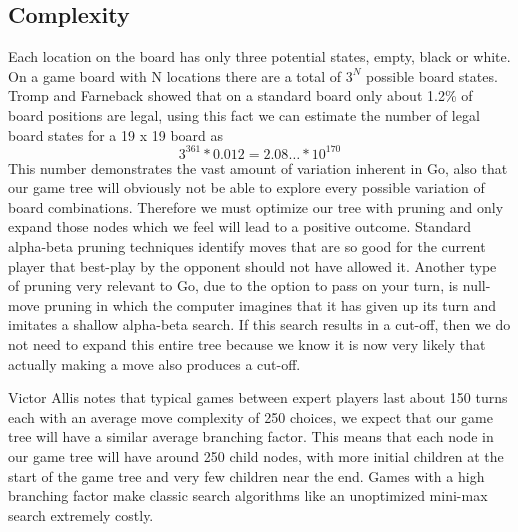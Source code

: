 \documentclass[conference]{IEEEtran}
\begin{document}
\subsection{Complexity}
Each location on the board has only three potential states, empty, black or white. On a game board with N locations there are a total of $3^N$ possible board states. Tromp and Farneback showed that on a standard board only about 1.2\% of board positions are legal, using this fact we can estimate the number of legal board states for a 19 x 19 board as \[3^{361} * 0.012 = 2.08\dots * 10^{170}\]This number demonstrates the vast amount of variation inherent in Go, also that our game tree will obviously not be able to explore every possible variation of board combinations. Therefore we must optimize our tree with pruning and only expand those nodes which we feel will lead to a positive outcome. Standard alpha-beta pruning techniques identify moves that are so good for the current player that best-play by the opponent should not have allowed it. Another type of pruning very relevant to Go, due to the option to pass on your turn, is null-move pruning in which the computer imagines that it has given up its turn and imitates a shallow alpha-beta search. If this search results in a cut-off, then we do not need to expand this entire tree because we know it is now very likely that actually making a move also produces a cut-off.\par
Victor Allis notes that typical games between expert players last about 150 turns each with an average move complexity of 250 choices, we expect that our game tree will have a similar average branching factor. This means that each node in our game tree will have around 250 child nodes, with more initial children at the start of the game tree and very few children near the end. Games with a high branching factor make classic search algorithms like an unoptimized mini-max search extremely costly.
\end{document}
